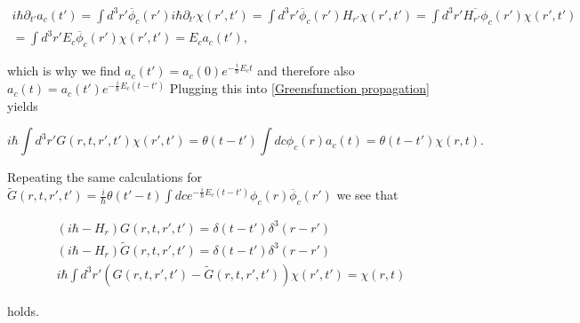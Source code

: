 \documentclass[a4paper,11pt]{article}
\begin{document}
\begin{align}
i \hbar \partial_{t'} a_c(t') = \int d^3 r' \overline{\phi}_c(r') i \hbar \partial_{t'}\chi(r',t')
= \int d^3 r' \overline{\phi}_c (r') H_{r'} \chi(r',t') = \int d^3 r' \overline{H_{r'} \phi}_c (r') \chi(r',t')\\
=\int d^3 r' E_c \overline{\phi}_c(r') \chi(r',t')
= E_c a_c(t'),
\end{align}

which is why we find \(a_c(t')= a_c(0) e^{-\frac{i}{\hbar} E_c t}\) and therefore also \(a_c(t)= a_c(t') e^{-\frac{i}{\hbar} E_c (t-t')}\)
Plugging this into \eqref{Greensfunction propagation} yields

\begin{equation}
i\hbar \int d^3 r' G(r,t,r',t') \chi(r',t')
=\theta(t-t') \int dc  \phi_c(r) a_c (t)= \theta(t-t') \chi(r,t).
\end{equation}

Repeating the same calculations for 
\(\tilde{G}(r,t,r',t') = \frac{i}{\hbar} \theta(t'-t) \int dc e^{-\frac{i}{\hbar} E_c(t-t')} \phi_c (r)\overline{\phi}_c(r')\)
we see that

\begin{align}
(i\hbar - H_r)G(r,t,r',t')= \delta(t-t')\delta^3(r-r')\\
(i\hbar - H_r)\tilde{G}(r,t,r',t')= \delta(t-t')\delta^3(r-r')\\
i \hbar \int d^3 r' (G(r,t,r',t')-\tilde{G}(r,t,r',t'))\chi(r',t')=\chi(r,t)
\end{align}

holds.
\end{document}
